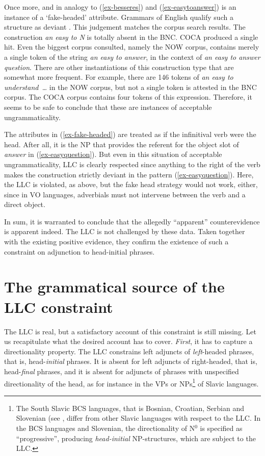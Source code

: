 \documentclass[output=paper
  ,nobabel
  ,uniformtopskip %
]{langscibook}
\begin{document}
\noindent
Once more, and in analogy to (\ref{ex-besseres}) and (\ref{ex-easytoanswer}) is an instance of a `fake-headed' attribute. Grammars of English qualify such a structure as deviant \citep[551]{HuddlestonPullum2002}. This judgement matches the corpus search results. The construction \emph{an easy to N} is totally absent in the BNC. COCA produced a single hit. Even the biggest corpus consulted, namely the NOW corpus, contains merely a single token of the string \emph{an easy to answer}, in the context of \emph{an easy to answer question}. There are other instantiations of this construction type that are somewhat more frequent. For example, there are 146 tokens of \emph{an easy to understand~\ldots} in the NOW corpus, but not a single token is attested in the BNC corpus. The COCA corpus contains four tokens of this expression. Therefore, it seems to be safe to conclude that these are instances of acceptable ungrammaticality.

The attributes in (\ref{ex-fake-headed}) are treated as if the infinitival verb were the head. After all, it is the NP that provides the referent for the object slot of \emph{answer} in (\ref{ex-easyquestion}). But even in this situation of acceptable ungrammaticality, LLC is clearly respected since anything to the right of the verb makes the construction strictly deviant in the pattern (\ref{ex-easyquestion}). Here, the LLC is violated, as above, but the fake head strategy would not work, either, since in VO languages, adverbials must not intervene between the verb and a direct object.

\eal
{}\label{ex-easyquestion}
\zl

\noindent
In sum, it is warranted to conclude that the allegedly ``apparent'' counterevidence is apparent indeed. The LLC is not challenged by these data. Taken together with the existing positive evidence, they confirm the existence of such a constraint on adjunction to head-initial phrases.

\section{The grammatical source of the LLC constraint}\label{sec-llcconstraint}

The LLC is real, but a satisfactory account of this constraint is still missing. Let us recapitulate what the desired account has to cover. \emph{First}, it has to capture a directionality property. The LLC constrains left adjuncts of \emph{left}-headed phrases, that is, head-\emph{initial} phrases. It is absent for left adjuncts of right-headed, that is, head-\emph{final} phrases, and it is absent for adjuncts of phrases with unspecified directionality of the head, as for instance in the VPs or NPs\footnote{The South Slavic BCS languages, that is Bosnian, Croatian, Serbian and Slovenian (see \citet{SzucsichHaider2015}, differ from other Slavic languages with respect to the LLC. In the BCS languages and Slovenian, the directionality of N$^0$ is specified as ``progressive'', producing \emph{head-initial} NP-structures, which are subject to the LLC.}  of Slavic languages.
\end{document}
